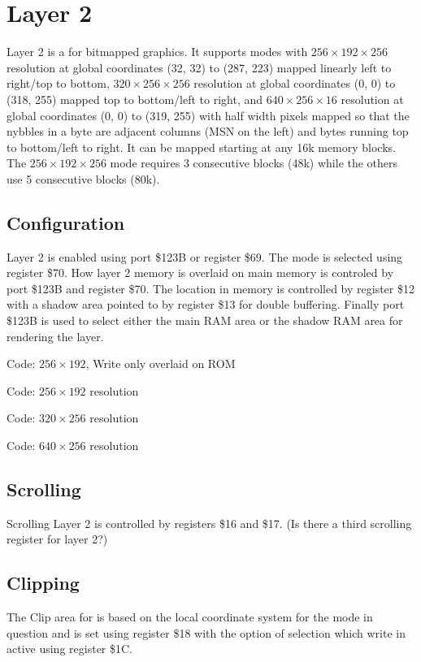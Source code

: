 \section{Layer 2}
Layer 2 is a for bitmapped graphics. It supports modes with
$256\times192\times256$ resolution at global coordinates (32, 32) to
(287, 223) mapped linearly left to right/top to bottom,
$320\times256\times256$ resolution at global coordinates (0, 0) to
(318, 255) mapped top to bottom/left to right, and
$640\times256\times16$ resolution at global coordinates (0, 0) to
(319, 255) with half width pixels mapped so that the nybbles in a byte
are adjacent columns (MSN on the left) and bytes running top to
bottom/left to right. It can be mapped starting at any 16k memory
blocks. The $256\times192\times256$ mode requires 3 consecutive blocks
(48k) while the others use 5 consecutive blocks (80k).

\subsection{Configuration}
Layer 2 is enabled using port \$123B or register \$69. The mode is
selected using register \$70. How layer 2 memory is overlaid on main
memory is controled by port \$123B and register \$70. The location in
memory is controlled by register \$12 with a shadow area pointed to by
register \$13 for double buffering. Finally port \$123B is used to
select either the main RAM area or the shadow RAM area for rendering
the layer.







Code: $256\times192$, Write only overlaid on ROM


Code: $256\times192$ resolution


Code: $320\times256$ resolution


Code: $640\times256$ resolution


\subsection{Scrolling}
Scrolling Layer 2 is controlled by registers \$16 and \$17. (Is there
a third scrolling register for layer 2?)




\subsection{Clipping}
The Clip area for is based on the local coordinate system for the mode
in question and is set using register \$18 with the option of
selection which write in active using register \$1C.



